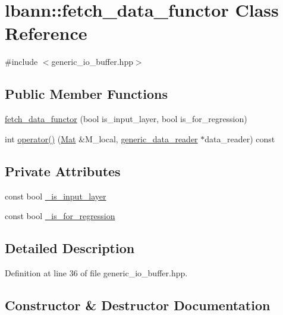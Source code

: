 \hypertarget{classlbann_1_1fetch__data__functor}{}\section{lbann\+:\+:fetch\+\_\+data\+\_\+functor Class Reference}
\label{classlbann_1_1fetch__data__functor}


{\ttfamily \#include $<$generic\+\_\+io\+\_\+buffer.\+hpp$>$}

\subsection*{Public Member Functions}
\begin{DoxyCompactItemize}
\item 
\hyperlink{classlbann_1_1fetch__data__functor_a00bb78798e6795205e32ba25780ae7fb}{fetch\+\_\+data\+\_\+functor} (bool is\+\_\+input\+\_\+layer, bool is\+\_\+for\+\_\+regression)
\item 
int \hyperlink{classlbann_1_1fetch__data__functor_ae1320d9ad90983b03bbabac9bb6d0748}{operator()} (\hyperlink{base_8hpp_a68f11fdc31b62516cb310831bbe54d73}{Mat} \&M\+\_\+local, \hyperlink{classlbann_1_1generic__data__reader}{generic\+\_\+data\+\_\+reader} $\ast$data\+\_\+reader) const
\end{DoxyCompactItemize}
\subsection*{Private Attributes}
\begin{DoxyCompactItemize}
\item 
const bool \hyperlink{classlbann_1_1fetch__data__functor_a8cc5a064d51a0a42e5a43c82ba576e67}{\+\_\+is\+\_\+input\+\_\+layer}
\item 
const bool \hyperlink{classlbann_1_1fetch__data__functor_a8946419e8dc9374216f8aa6bbc365b14}{\+\_\+is\+\_\+for\+\_\+regression}
\end{DoxyCompactItemize}


\subsection{Detailed Description}


Definition at line 36 of file generic\+\_\+io\+\_\+buffer.\+hpp.



\subsection{Constructor \& Destructor Documentation}
\mbox{\label{classlbann_1_1fetch__data__functor_a00bb78798e6795205e32ba25780ae7fb}} 
